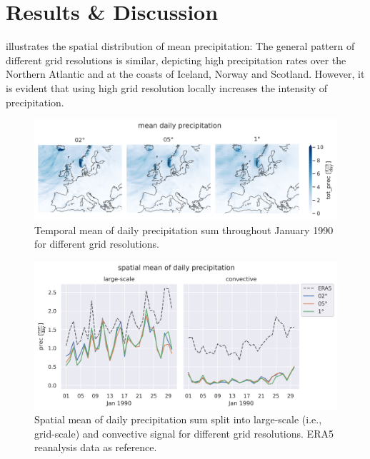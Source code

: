 \section{Results \& Discussion}


 illustrates the spatial distribution of mean precipitation: The general pattern of different grid resolutions is similar, depicting high precipitation rates over the Northern Atlantic and at the coasts of Iceland, Norway and Scotland. However, it is evident that using high grid resolution locally increases the intensity of precipitation.

\begin{figure}[h]
	\centering
	\includegraphics[width=\figwidth]{../figs/2-timmean.png}
	\caption{Temporal mean of daily precipitation sum throughout January 1990 for different grid resolutions.}
	\label{fig:timmean}
\end{figure}

\begin{figure}
	\centering
	\includegraphics[width=\figwidth]{../figs/5-gsp-con.png}
	\caption{Spatial mean of daily precipitation sum split into large-scale (i.e., grid-scale) and convective signal for different grid resolutions. ERA5 reanalysis data as reference.}
	\label{fig:fldmean}
\end{figure}

